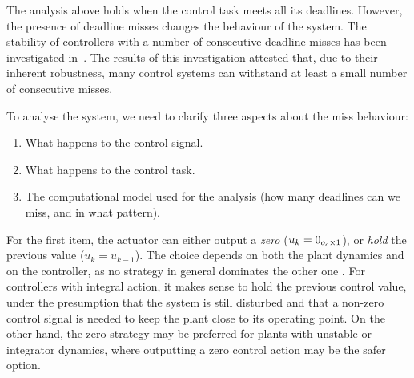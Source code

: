 The analysis above holds when the control task meets all its
deadlines. However, the presence of deadline misses changes the
behaviour of the system. The stability of controllers with a
number of consecutive deadline misses has been
investigated in~\cite{Maggio:2020}. The results of this
investigation attested that, due to their inherent robustness,
many control systems can withstand at least a small number of
consecutive misses.

To analyse the system, we need to clarify three aspects about the
miss behaviour:

\begin{enumerate}[label=(\roman*)]
\item What happens to the control signal.
\item What happens to the control task.
\item The computational model used for the analysis (how many
deadlines can we miss, and in what pattern).
\end{enumerate}

For the first item, the actuator can either output a
\emph{zero} ($u_k = 0_{o_c \times 1}$), or \emph{hold}
the previous value ($u_k = u_{k-1}$). The choice depends
on both the plant dynamics and on the controller, as no strategy
in general dominates the other one \cite{schenato09}. For controllers
with integral action, it makes sense to hold the previous control
value, under the presumption that the system is still
disturbed and that a non-zero control signal is needed to keep the 
plant close to its operating point. On the other hand, the zero strategy
may be preferred for plants with unstable or integrator dynamics,
where outputting a zero control action may be the safer option. 

